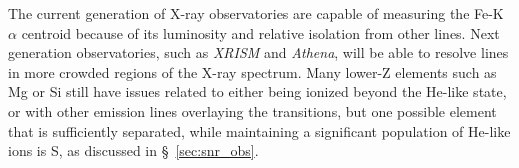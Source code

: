 \documentclass[twocolumn]{aastex631}
\begin{document}
The current generation of X-ray observatories are capable of measuring the Fe-K$\alpha$ centroid because of its luminosity and relative isolation from other lines. Next generation observatories, such as \textit{XRISM} and \textit{Athena}, will be able to resolve lines in more crowded regions of the X-ray spectrum. Many lower-Z elements such as Mg or Si still have issues related to either being ionized beyond the He-like state, or with other emission lines overlaying the transitions, but one possible element that is sufficiently separated, while maintaining a significant population of He-like ions is S, as discussed in \S~\ref{sec:snr_obs}.
\end{document}
